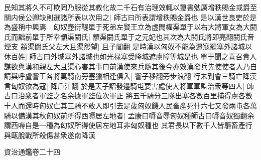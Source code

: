民知其將久不可欺罔乃服從其教化故二千石有治理效輒以璽書勉厲增秩賜金或爵至關内侯公卿缺則選諸所表以次用之|{
	師古曰所表謂增秩賜金爵也}
是以漢世良吏於是為盛稱中興焉　匈奴壺衍鞮單于死弟左賢王立為虚閭權渠單于以右大將軍女為大閼氏而黜前單于所幸顓渠閼氏|{
	顓渠閼氏單于之元妃也其次為大閼氏將即亮翻閼氏音煙支}
顓渠閼氏父左大且渠怨望|{
	且子閭翻}
是時漢以匈奴不能為邉寇罷塞外諸城以休百姓|{
	師古曰外城塞外諸城也如光禄塞受降城遮虜障等城是也}
單于聞之喜召貴人謀欲與漢和親左大且渠心害其事曰前漢使來兵隨其後今亦效漢發兵先使使者入乃自請與呼盧訾王各將萬騎南旁塞獵相逢俱入|{
	訾子移翻旁步浪翻}
行未到會三騎亡降漢言匈奴欲為寇|{
	降戶江翻}
於是天子詔發邉騎屯要害處使大將軍軍監治衆等四人|{
	師古曰治衆者軍監之名余據軍監位次軍正}
將五千騎分三隊出塞各數百里捕得虜各數十人而還時匈奴亡其三騎不敢入即引去是歲匈奴饑人民畜產死什六七又發兩屯各萬騎以備漢其秋匈奴前所得西嗕居左地者|{
	孟康曰嗕音辱匈奴種師古曰嗕音奴獨翻余謂西嗕自是一種為匈奴所得使居左地耳非匈奴種也}
其君長以下數千人皆驅畜產行與甌脫戰所殺傷甚衆遂南降漢

資治通鑑卷二十四
